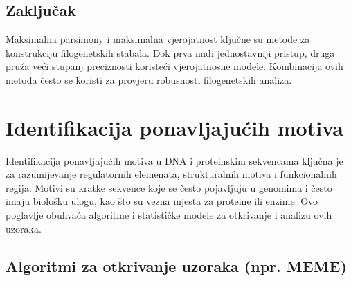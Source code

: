 \documentclass[10pt,a4paper,twoside]{article}
\begin{document}
\subsection*{Zaključak}

Maksimalna parsimony i maksimalna vjerojatnost ključne su metode za konstrukciju filogenetskih stabala. Dok prva nudi jednostavniji pristup, druga pruža veći stupanj preciznosti koristeći vjerojatnosne modele. Kombinacija ovih metoda često se koristi za provjeru robusnosti filogenetskih analiza.




























































\section*{Identifikacija ponavljajućih motiva}

Identifikacija ponavljajućih motiva u DNA i proteinskim sekvencama ključna je za razumijevanje regulatornih elemenata, strukturalnih motiva i funkcionalnih regija. Motivi su kratke sekvence koje se često pojavljuju u genomima i često imaju biološku ulogu, kao što su vezna mjesta za proteine ili enzime. Ovo poglavlje obuhvaća algoritme i statističke modele za otkrivanje i analizu ovih uzoraka.

\subsection*{Algoritmi za otkrivanje uzoraka (npr. MEME)}
\end{document}
